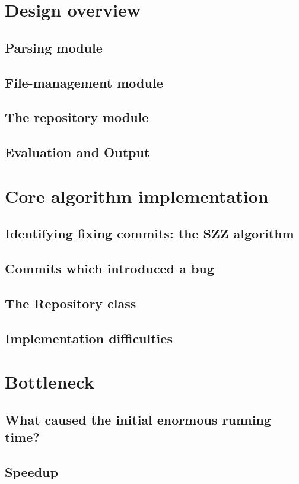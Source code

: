 \documentclass[12pt,twoside,notitlepage]{report}
\begin{document}
\section{Design overview}
\subsection{Parsing module}
\subsection{File-management module}
\subsection{The repository module}
\subsection{Evaluation and Output}
\section{Core algorithm implementation}
\subsection{Identifying fixing commits: the SZZ algorithm}
\subsection{Commits which introduced a bug}
\subsection{The Repository class}
\subsection{Implementation difficulties}
\section{Bottleneck}
\subsection{What caused the initial enormous running time?}
\subsection{Speedup}
\end{document}
